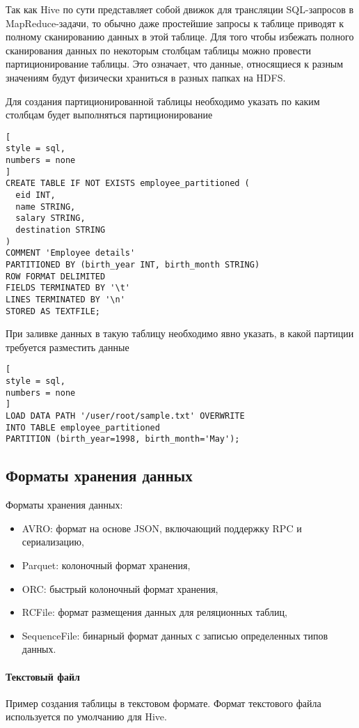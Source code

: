 \documentclass[%
	11pt,
	a4paper,
	utf8,
		]{article}
\begin{document}
Так как Hive по сути представляет собой движок для трансляции SQL-запросов в MapReduce-задачи, то обычно даже простейшие запросы к таблице приводят к полному сканированию данных в этой таблице. Для того чтобы избежать полного сканирования данных по некоторым столбцам таблицы можно провести партиционирование таблицы. Это означает, что данные, относящиеся к разным значениям будут физически храниться в разных папках на HDFS.

Для создания партиционированной таблицы необходимо указать по каким столбцам будет выполняться партиционирование
\begin{lstlisting}[
style = sql,
numbers = none
]
CREATE TABLE IF NOT EXISTS employee_partitioned (
  eid INT,
  name STRING,
  salary STRING,
  destination STRING
)
COMMENT 'Employee details'
PARTITIONED BY (birth_year INT, birth_month STRING)
ROW FORMAT DELIMITED
FIELDS TERMINATED BY '\t'
LINES TERMINATED BY '\n'
STORED AS TEXTFILE;
\end{lstlisting}

При заливке данных в такую таблицу необходимо явно указать, в какой партиции требуется разместить данные
\begin{lstlisting}[
style = sql,
numbers = none	
]
LOAD DATA PATH '/user/root/sample.txt' OVERWRITE
INTO TABLE employee_partitioned
PARTITION (birth_year=1998, birth_month='May');
\end{lstlisting}

\subsection{Форматы хранения данных}

Форматы хранения данных:
\begin{itemize}
	\item AVRO: формат на основе JSON, включающий поддержку RPC и сериализацию,
	
	\item Parquet: колоночный формат хранения,
	
	\item ORC: быстрый колоночный формат хранения,
	
	\item RCFile: формат размещения данных для реляционных таблиц,
	
	\item SequenceFile: бинарный формат данных с записью определенных типов данных.
\end{itemize}

\paragraph{Текстовый файл} Пример создания таблицы в текстовом формате. Формат текстового файла используется по умолчанию для Hive. 
\end{document}
